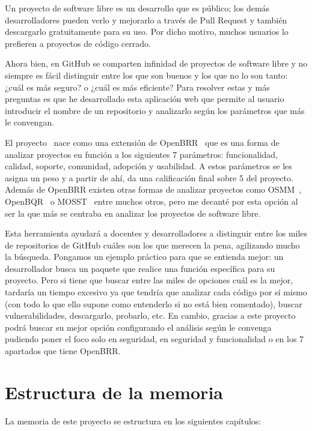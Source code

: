 \documentclass[a4paper, 12pt]{book}
\begin{document}
Un proyecto de software libre es un desarrollo que es público; los demás desarrolladores pueden verlo y mejorarlo a través de Pull Request y también descargarlo gratuitamente para su uso. Por dicho motivo, muchos usuarios lo prefieren a proyectos de código cerrado.

Ahora bien, en GitHub se comparten infinidad de proyectos de software libre y no siempre es fácil distinguir entre los que son buenos y los que no lo son tanto: ¿cuál es más seguro? o ¿cuál es más eficiente?
Para resolver estas y más preguntas es que he desarrollado esta aplicación web que permite al usuario introducir el nombre de un repositorio y analizarlo según los parámetros que más
le convengan.

El proyecto~\cite{website:RepositorioTFG}  nace como una extensión de OpenBRR~\cite{website:OpenBRR2} que es una forma de analizar proyectos en función a los siguientes 7 parámetros: funcionalidad, calidad, soporte, comunidad, adopción y usabilidad.
A estos parámetros se les asigna un peso y a partir de ahí, da una calificación final sobre 5 del proyecto. Además de OpenBRR existen otras formas de analizar proyectos como OSMM~\cite{website:OSMM}, OpenBQR~\cite{website:OpenBQR} o MOSST~\cite{website:MOSST} entre muchos otros, pero me decanté por esta opción al ser la que más se 
centraba en analizar los proyectos de software libre.

Esta herramienta ayudará a docentes y desarrolladores a distinguir entre los miles de repositorios de GitHub cuáles son los que merecen la pena, agilizando mucho la búsqueda. Pongamos un ejemplo práctico para que se entienda mejor: un desarrollador busca un paquete
que realice una función específica para su proyecto. Pero si tiene que buscar entre las miles de opciones cuál es la mejor, tardaría un tiempo excesivo ya que tendría que analizar cada código por sí mismo (con todo lo que ello supone como entenderlo si no está bien comentado),
buscar vulnerabilidades, descargarlo, probarlo, etc. En cambio, gracias a este proyecto podrá buscar su mejor opción configurando el análisis según le convenga pudiendo poner el foco solo en seguridad, en seguridad y funcionalidad o en los 7 apartados que tiene OpenBRR.


\section{Estructura de la memoria}
\label{sec:estructura}

La memoria de este proyecto se estructura en los siguientes capítulos:
\end{document}

